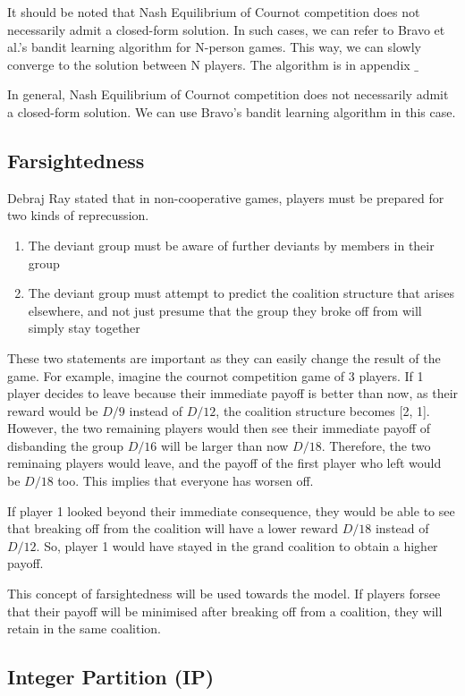 \documentclass[sigconf,anonymous]{aamas}
\newcommand{\ykc}[1]{{\color{blue} #1}}
\begin{document}
It should be noted that Nash Equilibrium of Cournot competition does not necessarily admit a closed-form solution. In such cases, we can refer to Bravo et al.'s bandit learning algorithm for N-person games. This way, we can slowly converge to the solution between N players. The algorithm is in appendix $\_$%

\ykc{In general, Nash Equilibrium of Cournot competition does not necessarily admit a closed-form solution. We can use Bravo's bandit learning algorithm in this case.}

\subsection{Farsightedness} 
Debraj Ray stated that in non-cooperative games, players must be prepared for two kinds of reprecussion. 
\begin{enumerate}
	\item The deviant group must be aware of further deviants by members in their group 
	\item The deviant group must attempt to predict the coalition structure that arises elsewhere, and not just presume that the group they broke off from will simply stay together
\end{enumerate}
These two statements are important as they can easily change the result of the game. For example, imagine the cournot competition game of 3 players. If 1 player decides to leave because their immediate payoff is better than now, as their reward would be $D/9$ instead of $D/12$, the coalition structure becomes [2, 1]. However, the two remaining players would then see their immediate payoff of disbanding the group $D/16$ will be larger than now $D/18$. Therefore, the two reminaing players would leave, and the payoff of the first player who left would be $D/18$ too. This implies that everyone has worsen off. 

If player 1 looked beyond their immediate consequence, they would be able to see that breaking off from the coalition will have a lower reward $D/18$ instead of $D/12$. So, player 1 would have stayed in the grand coalition to obtain a higher payoff. 

This concept of farsightedness will be used towards the model. If players forsee that their payoff will be minimised after breaking off from a coalition, they will retain in the same coalition. 

\subsection{Integer Partition (IP)}
\end{document}
